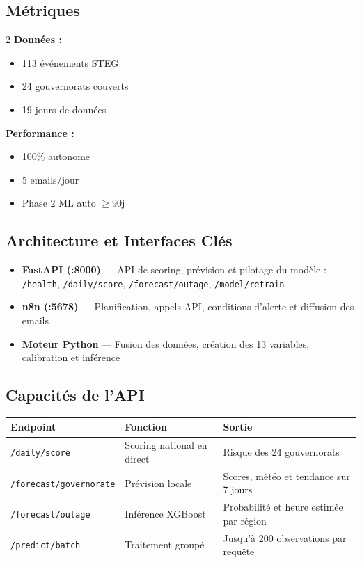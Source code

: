 \documentclass[10pt,a4paper]{article}
\begin{document}
\subsection*{Métriques}

\begin{multicols}{2}
\footnotesize
\textbf{Données :}
\begin{itemize}
\item 113 événements STEG
\item 24 gouvernorats couverts
\item 19 jours de données
\end{itemize}

\columnbreak

\textbf{Performance :}
\begin{itemize}
\item 100\% autonome
\item 5 emails/jour
\item Phase 2 ML auto $\geq$90j
\end{itemize}
\end{multicols}

\subsection*{Architecture et Interfaces Clés}

\begin{itemize}
\item \textbf{FastAPI (:8000)} — API de scoring, prévision et pilotage du modèle : \texttt{/health}, \texttt{/daily/score}, \texttt{/forecast/outage}, \texttt{/model/retrain}
\item \textbf{n8n (:5678)} — Planification, appels API, conditions d'alerte et diffusion des emails
\item \textbf{Moteur Python} — Fusion des données, création des 13 variables, calibration et inférence
\end{itemize}
\vspace{0.3cm}

\subsection*{Capacités de l'API}

\begin{center}
\footnotesize
\begin{tabular}{lp{4.1cm}p{5.2cm}}
\toprule
\textbf{Endpoint} & \textbf{Fonction} & \textbf{Sortie} \\
\midrule
\texttt{/daily/score} & Scoring national en direct & Risque des 24 gouvernorats \\
\texttt{/forecast/governorate} & Prévision locale & Scores, météo et tendance sur 7 jours \\
\texttt{/forecast/outage} & Inférence XGBoost & Probabilité et heure estimée par région \\
\texttt{/predict/batch} & Traitement groupé & Jusqu'à 200 observations par requête \\
\bottomrule
\end{tabular}
\end{center}
\vspace{0.3cm}
\end{document}

